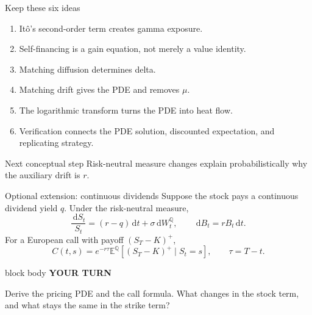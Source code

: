 \documentclass[handout,10pt,aspectratio=169]{beamer}
\newenvironment{pausebox}{%
  \begin{beamercolorbox}[rounded=true,sep=0.8em,wd=\textwidth]{block body}
  \textbf{\color{CourseGold}YOUR TURN}\quad
}{\end{beamercolorbox}}
\newcommand{\dd}{\,\mathrm d}
\newcommand{\E}{\mathbb E}
\newcommand{\Q}{\mathbb Q}
\newcommand{\1}{\mathbf 1}
\begin{document}
\begin{frame}{Keep these six ideas}
\begin{enumerate}
  \item It\^o's second-order term creates gamma exposure.
  \item Self-financing is a gain equation, not merely a value identity.
  \item Matching diffusion determines delta.
  \item Matching drift gives the PDE and removes \(\mu\).
  \item The logarithmic transform turns the PDE into heat flow.
  \item Verification connects the PDE solution, discounted expectation, and
        replicating strategy.
\end{enumerate}
\begin{exampleblock}{Next conceptual step}
Risk-neutral measure changes explain probabilistically why the auxiliary
drift is \(r\).
\end{exampleblock}
\end{frame}

\begin{frame}{Optional extension: continuous dividends}
Suppose the stock pays a continuous dividend yield \(q\). Under the
risk-neutral measure,
\[
\frac{\dd S_t}{S_t}=(r-q)\dd t+\sigma\dd W_t^\Q,
\qquad \dd B_t=rB_t\dd t.
\]
For a European call with payoff \((S_T-K)^+\),
\[
C(t,s)=e^{-r\tau}\E^\Q\!\left[(S_T-K)^+\mid S_t=s\right],
\qquad \tau=T-t.
\]
\begin{pausebox}
Derive the pricing PDE and the call formula. What changes in the stock term,
and what stays the same in the strike term?
\end{pausebox}
\end{frame}
\end{document}
